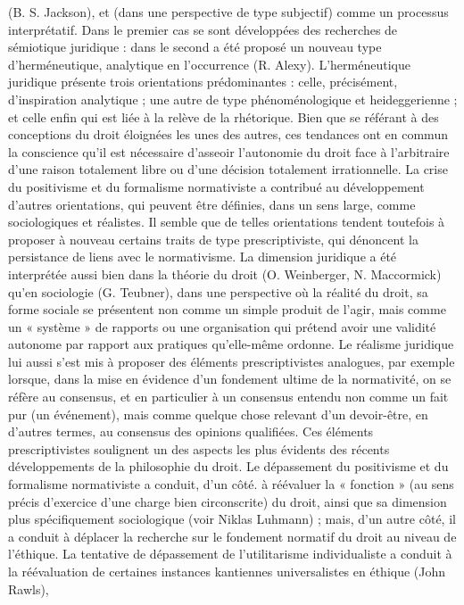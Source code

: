 (B. S. Jackson), et (dans une perspective
de type subjectif) comme un processus
interprétatif. Dans le premier cas se sont
développées des recherches de sémiotique juridique : dans le second a été proposé un nouveau type d’herméneutique,
analytique en l'occurrence (R. Alexy).
L’herméneutique juridique présente trois
orientations prédominantes : celle, précisément, d'inspiration analytique ; une
autre de type phénoménologique et heideggerienne ; et celle enfin qui est liée à
la relève de la rhétorique. Bien que se
référant à des conceptions du droit éloignées les unes des autres, ces tendances
ont en commun la conscience qu'il est
nécessaire d’asseoir l’autonomie du droit
face à l’arbitraire d’une raison totalement
libre ou d’une décision totalement irrationnelle. La crise du positivisme et du
formalisme normativiste a contribué au
développement d’autres orientations, qui
peuvent être définies, dans un sens large,
comme sociologiques et réalistes. Il
semble que de telles orientations tendent
toutefois à proposer à nouveau certains
traits de type prescriptiviste, qui dénoncent la persistance de liens avec le normativisme. La dimension juridique a été
interprétée aussi bien dans la théorie du
droit (O. Weinberger, N. Maccormick)
qu’en sociologie (G. Teubner), dans une
perspective où la réalité du droit, sa forme
sociale se présentent non comme un
simple produit de l’agir, mais comme un
« système » de rapports ou une organisation qui prétend avoir une validité autonome par rapport aux pratiques
qu’elle-même ordonne. Le réalisme juridique lui
aussi s’est mis à proposer des éléments
prescriptivistes analogues, par exemple
lorsque, dans la mise en évidence d’un
fondement ultime de la normativité, on se
réfère au consensus, et en particulier à un
consensus entendu non comme un fait pur
(un événement), mais comme quelque
chose relevant d’un devoir-être, en
d’autres termes, au consensus des opinions qualifiées. Ces éléments prescriptivistes soulignent un des aspects les plus
évidents des récents développements de
la philosophie du droit. Le dépassement
du positivisme et du formalisme normativiste a conduit, d’un côté. à réévaluer la
« fonction » (au sens précis d’exercice
d’une charge bien circonscrite) du droit,
ainsi que sa dimension plus spécifiquement
%
 sociologique (voir Niklas Luhmann) ; mais, d’un autre côté, il a conduit
à déplacer la recherche sur le fondement
normatif du droit au niveau de l'éthique.
La tentative de dépassement de l’utilitarisme individualiste a conduit à la réévaluation de certaines instances kantiennes
universalistes en éthique (John Rawls),
